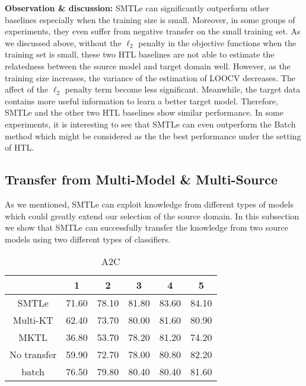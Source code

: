 \textbf{Observation \& discussion:} SMTLe can significantly outperform other baselines especially when the training size is small. Moreover, in some groups of experiments, they even suffer from negative transfer on the small training set. As we discussed above, without the $\ell_2$ penalty in the objective functions when the training set is small, these two HTL baselines are not able to estimate the relatedness between the source model and target domain well. However, as the training size increases, the variance of the estimation of LOOCV decreases. The affect of the $\ell_2$ penalty term become less significant. Meanwhile, the target data contains more useful information to learn a better target model. Therefore, SMTLe and the other two HTL baselines show similar performance. In some experiments, it is interesting to see that SMTLe can even outperform the Batch method which might be considered as the the best performance under the setting of HTL.


\subsection{Transfer from Multi-Model \& Multi-Source}
As we mentioned, SMTLe can exploit knowledge from different types of models which could greatly extend our selection of the source domain. In this subsection we show that SMTLe can successfully transfer the knowledge from two source models using two different types of classifiers.
\begin{table}[htbp]
	\centering
	\caption{A2C}
	\begin{tabular}{cccccc}
		\toprule
		& 1     & 2     & 3     & 4     & 5 \\
		\midrule
		SMTLe & 71.60 & 78.10 & 81.80 & 83.60 & 84.10 \\
		Multi-KT & 62.40 & 73.70 & 80.00 & 81.60 & 80.90 \\
		MKTL  & 36.80 & 53.70 & 78.20 & 81.20 & 74.20 \\
		No transfer & 59.90 & 72.70 & 78.00 & 80.80 & 82.20 \\
		batch & 76.50 & 79.80 & 80.40 & 80.40 & 81.60 \\
		\bottomrule
	\end{tabular}%
\end{table}%



